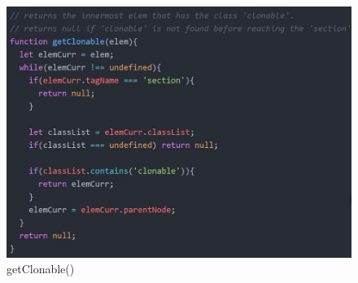 \documentclass[11pt]{article}
\begin{document}
\begin{spacing}{1.0}
\begin{itemize}
	\begin{figure}[H]
	\centering
	\includegraphics[scale=.5]{figures/js/getClonable.jpg}
	\caption{getClonable()}
\end{figure}


\end{itemize}
\end{spacing}
\end{document}
